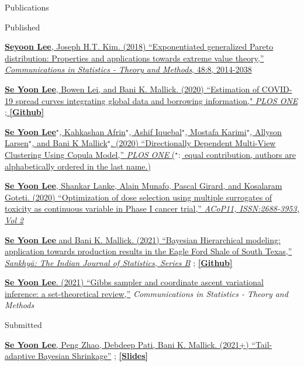 \documentclass{resume} %
\begin{document}
\begin{rSection}{Publications}
\begin{rSubsection}{Published}{}{}{}
\item[] [1] \href{https://www.tandfonline.com/doi/pdf/10.1080/03610926.2018.1441418?needAccess=true}
{\underline{\textbf{Seyoon Lee}}, Joseph H.T. Kim. (2018) ``Exponentiated generalized Pareto distribution:
Properties and applications towards extreme
value theory,''
\textit{Communications in Statistics - Theory and Methods},
 48:8, 2014-2038}
\item[] [2] \href{https://journals.plos.org/plosone/article?id=10.1371/journal.pone.0236860}
{\underline{\textbf{Se Yoon Lee}}, Bowen Lei, and Bani K. Mallick. (2020)
``Estimation of COVID-19 spread curves integrating global data and borrowing information," \textit{PLOS ONE}
;
\href{https://github.com/StevenBoys/BHRM}{\underline{\textbf{[Github]}}}
}
\item[] [3] 
\href{https://journals.plos.org/plosone/article?id=10.1371/journal.pone.0238996}
{\underline{\textbf{Se Yoon Lee}}$^\star$, Kahkashan Afrin$^\star$, Ashif Iquebal$^\star$, Mostafa Karimi$^\star$, Allyson Larsen$^\star$, and Bani K Mallick$^\star$. (2020)
``Directionally Dependent Multi-View Clustering Using Copula Model,'' \textit{PLOS ONE} ($^\star:$ equal contribution, authors are alphabetically ordered in the last name.)}
\item[] [4] 
\href{https://github.com/yain22/2PLD/blob/main/Poster/ACOP_Se_Yoon_Lee_PhD.pdf}{\underline{\textbf{Se Yoon Lee}}, Shankar Lanke, Alain Munafo, Pascal Girard, and Kosalaram Goteti. (2020)
``Optimization of dose selection using multiple surrogates of toxicity as continuous variable in Phase I cancer trial,'' \textit{ ACoP11, ISSN:2688-3953, Vol 2}}
\item[] [5]
\href{https://rdcu.be/ceg4p}
{\underline{\textbf{Se Yoon Lee}} and Bani K. Mallick. (2021)
``Bayesian Hierarchical modeling: application towards
production results in the Eagle Ford Shale of South Texas,'' \textit{Sankhyā: The Indian Journal of Statistics, Series B}}
;
\href{https://github.com/yain22/SWM}{\underline{\textbf{[Github]}}}
\item[] [6]
\href{https://www.tandfonline.com/doi/full/10.1080/03610926.2021.1921214?src=}
{\underline{\textbf{Se Yoon Lee}}. (2021)
``Gibbs sampler and coordinate ascent variational inference: a set-theoretical review,''}
\textit{Communications in Statistics - Theory and Methods}
\end{rSubsection}


\begin{rSubsection}{
Submitted}{}{}{}
\item[] [1]
\href{https://arxiv.org/abs/2007.02192}
{\underline{\textbf{Se Yoon Lee}}, Peng Zhao, Debdeep Pati, Bani K. Mallick. (2021+)
``Tail-adaptive Bayesian Shrinkage''}
;
\href{https://www.dropbox.com/s/5sx21h4guwl4dyz/Main_Doctoral_Dissertation_Work.pdf?dl=0}{\underline{\textbf{[Slides]}}}
\end{rSubsection}
\end{rSection}
\end{document}
